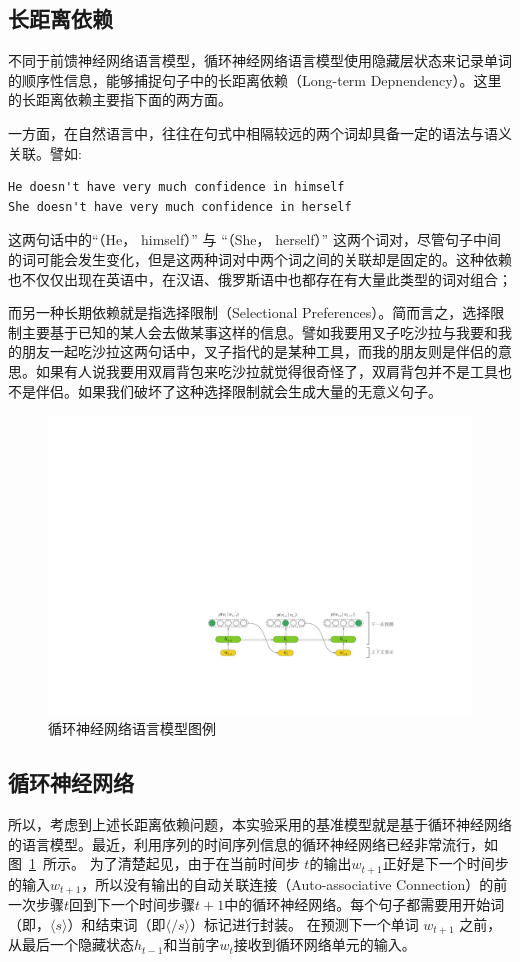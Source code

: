 \subsection{长距离依赖}

不同于前馈神经网络语言模型，循环神经网络语言模型使用隐藏层状态来记录单词的顺序性信息，能够捕捉句子中的长距离依赖（Long-term Depnendency）。这里的长距离依赖主要指下面的两方面。

一方面，在自然语言中，往往在句式中相隔较远的两个词却具备一定的语法与语义关联。譬如:
\begin{verbatim}
He doesn't have very much confidence in himself
She doesn't have very much confidence in herself
\end{verbatim}
这两句话中的``（He， himself）'' 与 ``（She， herself）'' 这两个词对，尽管句子中间的词可能会发生变化，但是这两种词对中两个词之间的关联却是固定的。这种依赖也不仅仅出现在英语中，在汉语、俄罗斯语中也都存在有大量此类型的词对组合；

而另一种长期依赖就是指选择限制（Selectional Preferences）。简而言之，选择限制主要基于已知的某人会去做某事这样的信息。譬如我要用叉子吃沙拉与我要和我的朋友一起吃沙拉这两句话中，叉子指代的是某种工具，而我的朋友则是伴侣的意思。如果有人说我要用双肩背包来吃沙拉就觉得很奇怪了，双肩背包并不是工具也不是伴侣。如果我们破坏了这种选择限制就会生成大量的无意义句子。

\begin{figure}[!ht]
  \centering
  \includegraphics[width=1\columnwidth]{./figures/lm.pdf}
  \caption{循环神经网络语言模型图例}
  \label{fig:lm}
\end{figure}

\subsection{循环神经网络}
所以，考虑到上述长距离依赖问题，本实验采用的基准模型就是基于循环神经网络的语言模型。最近，利用序列的时间序列信息的循环神经网络已经非常流行，如图~\ref{fig:lm}~所示。 为了清楚起见，由于在当前时间步 $ t $的输出$ w_ {t + 1} $正好是下一个时间步的输入$ w_ {t + 1} $，所以没有输出的自动关联连接（Auto-associative Connection）的前一次步骤$ t $回到下一个时间步骤$ t + 1 $中的循环神经网络。每个句子都需要用开始词（即，$ \langle s \rangle $）和结束词（即$ \langle / s \rangle $）标记进行封装。 在预测下一个单词 $ w_ {t + 1} $ 之前，从最后一个隐藏状态$ h_ {t-1} $和当前字$ w_t $接收到循环网络单元的输入。

